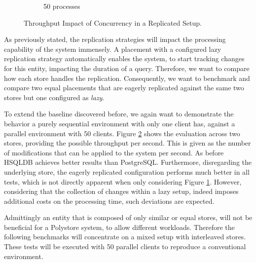 \begin{figure}[t]
\begin{subfigure}{.5\textwidth}
      \caption{50 processes}
      \label{fig:terminal50}
    \end{subfigure}
    \caption{Throughput Impact of Concurrency in a Replicated Setup.}
    \label{fig:terminal}
\end{figure}

As previously stated, the replication strategies will impact the processing capability of the system immensely.
A placement with a configured lazy replication strategy automatically enables the system, to start tracking changes for this entity, impacting the duration of a query.
Therefore, we want to compare how each store handles the replication. Consequently, we want to benchmark and compare two equal placements that are eagerly replicated
against the same two stores but one configured as \emph{lazy}.

To extend the baseline discovered before, we again want to demonstrate the behavior a purely sequential environment with only one client has, 
against a parallel environment with 50 clients.
Figure \ref{fig:terminal} shows the evaluation across two stores, providing the possible throughput per second. This is given as the number of modifications that can be 
applied to the system per second. As before HSQLDB achieves better results than PostgreSQL. Furthermore, disregarding the underlying store,
the eagerly replicated configuration performs much better in all tests, which is not directly apparent when only considering Figure \ref{fig:terminal50}.
However, considering that the collection of changes within a lazy setup, indeed imposes additional costs on the processing time, such deviations are expected.


Admittingly an entity that is composed of only similar or equal stores, will not be beneficial for a Polystore system, to allow different workloads.
Therefore the following benchmarks will concentrate on a mixed setup with interleaved stores. These tests will be executed with 50 parallel clients to reproduce a 
conventional environment. 


